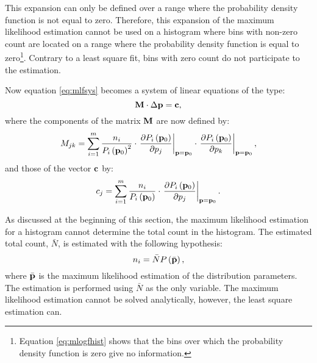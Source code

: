 \documentclass[twoside]{book}
\begin{document}
This expansion can only be defined over a range where the
probability density function is not equal to zero. Therefore, this
expansion of the maximum likelihood estimation cannot be used on a
histogram where bins with non-zero count are located on a range
where the probability density function is equal to
zero\footnote{Equation \ref{eq:mlogfhist} shows that the bins over
which the probability density function is zero give no
information.}. Contrary to a least square fit, bins with zero
count do not participate to the estimation.

Now equation \ref{eq:mlfsys} becomes a system of linear equations
of the type:
\begin{equation}
\label{eq:mlflinequs}
  {\bf M}\cdot\Delta{\bf p}={\bf c},
\end{equation}
where the components of the matrix ${\bf M}$ are now defined by:
\begin{equation}
\label{eq:mlfmatrix}
 M_{jk}=\sum_{i=1}^m {\displaystyle
n_i\over\displaystyle P_i\left({\bf p}_0\right)^2
}\cdot\left.{\displaystyle\partial P_i\left({\bf p}_0\right)
\over\displaystyle\partial p_j} \right|_{{\bf p}={\bf
p}_0}\cdot\left.{\displaystyle\partial P_i\left({\bf p}_0\right)
\over\displaystyle\partial p_k} \right|_{{\bf p}={\bf p}_0},
\end{equation}
and those of the vector ${\bf c}$ by:
\begin{equation}
\label{eq:mlfvector}
 c_j=\sum_{i=1}^m {\displaystyle
n_i\over\displaystyle P_i\left({\bf p}_0\right)
}\cdot\left.{\displaystyle\partial P_i\left({\bf p}_0\right)
\over\displaystyle\partial p_j} \right|_{{\bf p}={\bf p}_0}.
\end{equation}

As discussed at the beginning of this section, the maximum
likelihood estimation for a histogram cannot determine the total
count in the histogram. The estimated total count, $\bar{N}$, is
estimated with the following hypothesis:
\begin{equation}
   n_i=\bar{N}P\left(\bar{\bf p}\right),
\end{equation}
where $\bar{\bf p}$ is the maximum likelihood estimation of the
distribution parameters. The estimation is performed using
$\bar{N}$ as the only variable. The maximum likelihood estimation
cannot be solved analytically, however, the least square
estimation can.
\end{document}
